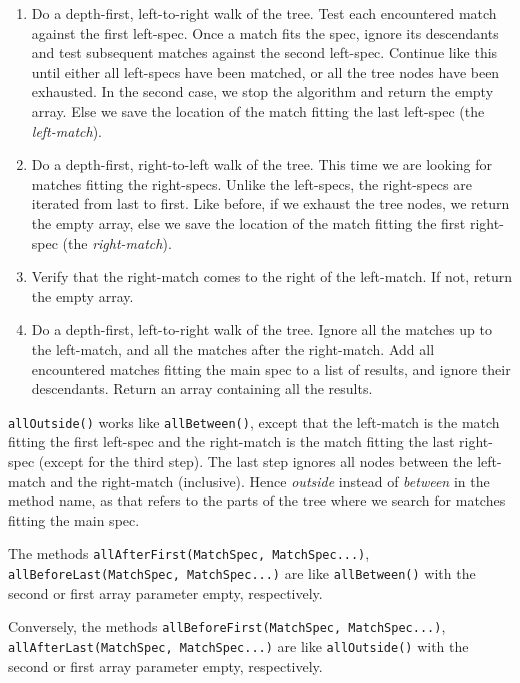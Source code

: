 \begin{enumerate}

\item Do a depth-first, left-to-right walk of the tree. Test each encountered
  match against the first left-spec. Once a match fits the spec, ignore its
  descendants and test subsequent matches against the second left-spec. Continue
  like this until either all left-specs have been matched, or all the tree nodes
  have been exhausted. In the second case, we stop the algorithm and return the
  empty array. Else we save the location of the match fitting the last left-spec
  (the \emph{left-match}).

\item Do a depth-first, right-to-left walk of the tree. This time we are looking
  for matches fitting the right-specs. Unlike the left-specs, the right-specs
  are iterated from last to first. Like before, if we exhaust the tree nodes, we
  return the empty array, else we save the location of the match fitting the
  first right-spec (the \emph{right-match}).

\item Verify that the right-match comes to the right of the left-match. If not,
  return the empty array.

\item Do a depth-first, left-to-right walk of the tree. Ignore all the matches
  up to the left-match, and all the matches after the right-match. Add all
  encountered matches fitting the main spec to a list of results, and ignore
  their descendants. Return an array containing all the results.

\end{enumerate}

\texttt{allOutside()} works like \texttt{allBetween()}, except that the
left-match is the match fitting the first left-spec and the right-match is the
match fitting the last right-spec (except for the third step). The last step
ignores all nodes between the left-match and the right-match (inclusive). Hence
\emph{outside} instead of \emph{between} in the method name, as that refers to
the parts of the tree where we search for matches fitting the main spec.

The methods \texttt{allAfterFirst(MatchSpec, MatchSpec...)},
\texttt{allBeforeLast(MatchSpec, MatchSpec...)} are like \texttt{allBetween()}
with the second or first array parameter empty, respectively.

Conversely, the methods \texttt{allBeforeFirst(MatchSpec, MatchSpec...)},
\texttt{allAfterLast(MatchSpec, MatchSpec...)} are like \texttt{allOutside()}
with the second or first array parameter empty, respectively.

